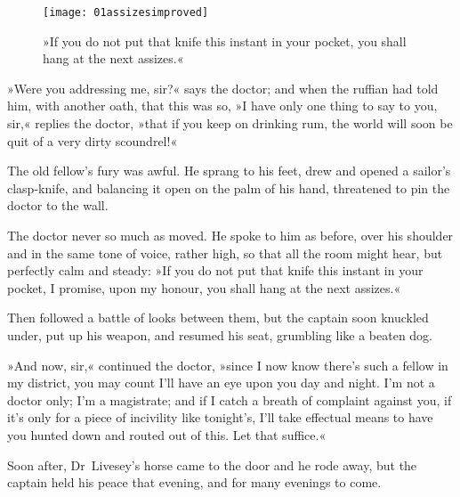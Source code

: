  \begin{figure}[p]
\centering
\texttt{[image: 01assizesimproved]}
\caption[»You shall hang at the next assizes.«]{»If you do not put that knife this instant in your pocket, you shall hang at the next assizes.«}
\end{figure}


»Were you addressing me, sir?« says the doctor; and when the ruffian had told him, with another oath, that this was so, »I have only one thing to say to you, sir,« replies the doctor, »that if you keep on drinking rum, the world will soon be quit of a very dirty scoundrel!«

The old fellow's fury was awful. He sprang to his feet, drew and opened a sailor's clasp-knife, and balancing it open on the palm of his hand, threatened to pin the doctor to the wall.

The doctor never so much as moved. He spoke to him as before, over his shoulder and in the same tone of voice, rather high, so that all the room might hear, but perfectly calm and steady: »If you do not put that knife this instant in your pocket, I promise, upon my honour, you shall hang at the next assizes.«


Then followed a battle of looks between them, but the captain soon knuckled under, put up his weapon, and resumed his seat, grumbling like a beaten dog.

»And now, sir,« continued the doctor, »since I now know there's such a fellow in my district, you may count I'll have an eye upon you day and night. I'm not a doctor only; I'm a magistrate; and if I catch a breath of complaint against you, if it's only for a piece of incivility like tonight's, I'll take effectual means to have you hunted down and routed out of this. Let that suffice.«

Soon after, Dr~Livesey's horse came to the door and he rode away, but the captain held his peace that evening, and for many evenings to come.
